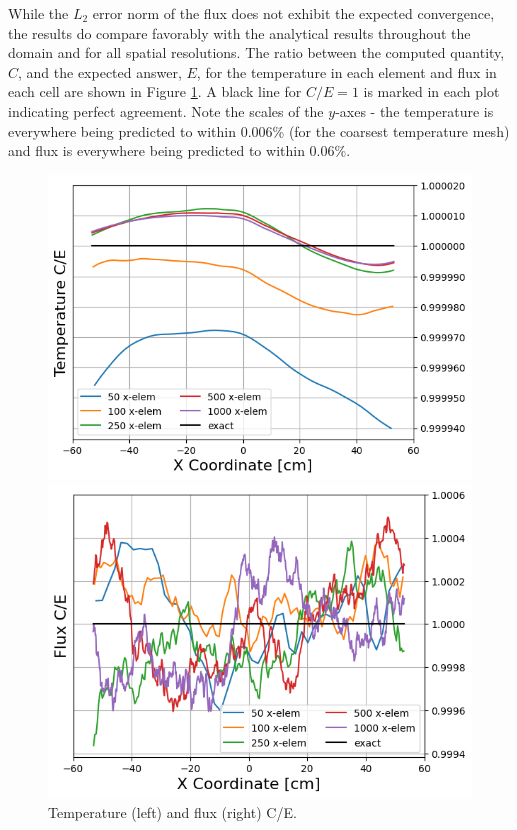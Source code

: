 \documentclass[letterpaper]{mc2023}
\begin{document}
While the $L_2$ error norm of the flux does not exhibit the expected convergence, the results do compare favorably with the analytical results
throughout the domain and for all spatial resolutions. The ratio between the computed quantity, $C$, and the expected answer, $E$, for the
temperature in each element and flux in each cell are shown in Figure \ref{fig:ce}. A black line for $C/E = 1$ is marked in each plot indicating
perfect agreement. Note the scales of the $y$-axes - the temperature is everywhere being predicted to within 0.006\% (for the coarsest temperature
mesh) and flux is everywhere being predicted to within 0.06\%.
\begin{figure}[H]
    \centering
    \begin{minipage}[b]{0.495\linewidth}
        \includegraphics[width=\linewidth]{figures/temp_num_to_analy_ratios.png}
    \end{minipage}
    \begin{minipage}[b]{0.495\linewidth}
        \includegraphics[width=\linewidth]{figures/flux_num_to_analy_ratios.png}
    \end{minipage}
    \caption{Temperature (left) and flux (right) C/E.}
    \label{fig:ce}
\end{figure}
\end{document}
